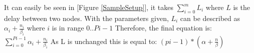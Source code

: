 \documentclass[a4paper,twoside,11pt]{article}
\begin{document}
It can easily be seen in [Figure \ref{SampleSetup}], it takes $\sum\limits_{i=0}^m L_i$ where $L$ is the delay between two nodes.
With the parameters given, $L_i$ can be described as $\alpha_i + \frac{n_i}{\beta_i}$ where $i$ is in range $0 .. Pi-1$
Therefore, the final equation is: $\sum\limits_{i=0}^{Pi-1} \alpha_i + \frac{n_i}{\beta_i}$
As L is unchanged this is equal to: $(pi-1) * (\alpha + \frac{n}{\beta})$
\end{document}
